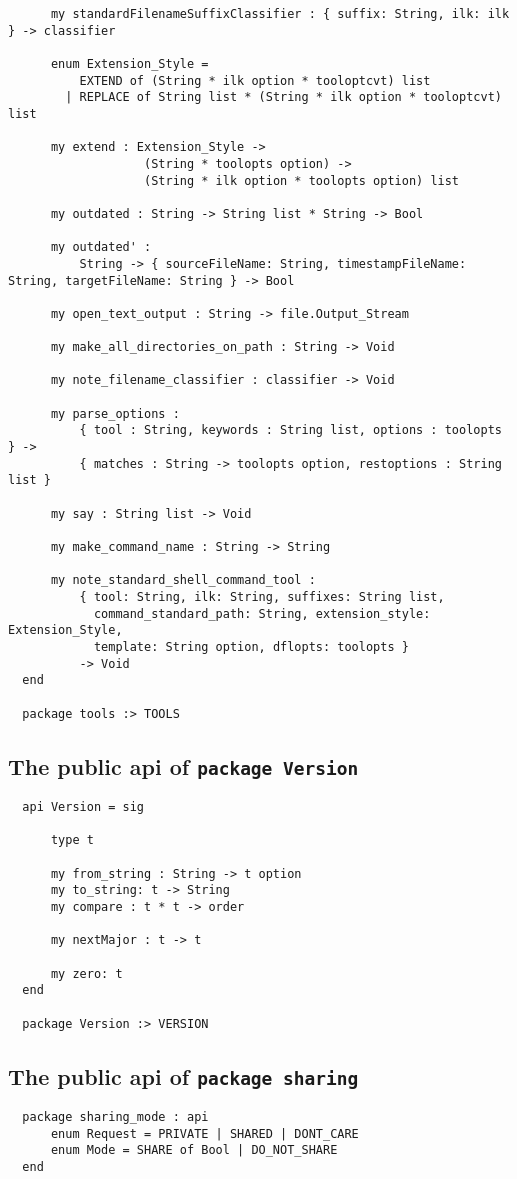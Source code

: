 \begin{small}
\begin{verbatim}
      my standardFilenameSuffixClassifier : { suffix: String, ilk: ilk } -> classifier
  
      enum Extension_Style =
          EXTEND of (String * ilk option * tooloptcvt) list
        | REPLACE of String list * (String * ilk option * tooloptcvt) list
  
      my extend : Extension_Style ->
                   (String * toolopts option) ->
                   (String * ilk option * toolopts option) list
  
      my outdated : String -> String list * String -> Bool
  
      my outdated' :
          String -> { sourceFileName: String, timestampFileName: String, targetFileName: String } -> Bool
  
      my open_text_output : String -> file.Output_Stream
  
      my make_all_directories_on_path : String -> Void
  
      my note_filename_classifier : classifier -> Void
  
      my parse_options :
          { tool : String, keywords : String list, options : toolopts } ->
          { matches : String -> toolopts option, restoptions : String list }
  
      my say : String list -> Void
  
      my make_command_name : String -> String
  
      my note_standard_shell_command_tool :
          { tool: String, ilk: String, suffixes: String list,
            command_standard_path: String, extension_style: Extension_Style,
            template: String option, dflopts: toolopts }
          -> Void
  end
  
  package tools :> TOOLS
\end{verbatim}
\end{small}

\subsection{The public api of {\tt package Version}}

\begin{small}
\begin{verbatim}
  api Version = sig
  
      type t
  
      my from_string : String -> t option
      my to_string: t -> String
      my compare : t * t -> order
  
      my nextMajor : t -> t
  
      my zero: t
  end
  
  package Version :> VERSION
\end{verbatim}
\end{small}

\subsection{The public api of {\tt package sharing}}

\begin{small}
\begin{verbatim}
  package sharing_mode : api
      enum Request = PRIVATE | SHARED | DONT_CARE
      enum Mode = SHARE of Bool | DO_NOT_SHARE
  end
\end{verbatim}
\end{small}
